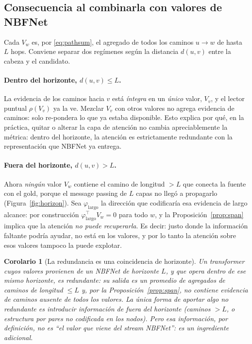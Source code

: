\documentclass[11pt]{article}
\theoremstyle{plain}
\newtheorem{corollary}[proposition]{Corolario}
\theoremstyle{definition}
\begin{document}
\subsection{Consecuencia al combinarla con valores de NBFNet}

Cada $V_w$ es, por \eqref{eq:pathsum}, el agregado de todos los caminos $u\to w$ de hasta $L$ hops.
Conviene separar dos regímenes según la distancia $d(u,v)$ entre la cabeza y el candidato.

\paragraph{Dentro del horizonte, $d(u,v)\le L$.}
La evidencia de los caminos hacia $v$ está \emph{íntegra} en un \emph{único} valor, $V_v$, y el lector
puntual $\rho(V_v)$ ya la ve. Mezclar $V_v$ con otros valores no agrega evidencia de caminos: solo
re-pondera lo que ya estaba disponible. Esto explica por qué, en la práctica, quitar o alterar la
capa de atención no cambia apreciablemente la métrica: dentro del horizonte, la atención es
estrictamente redundante con la representación que NBFNet ya entrega.

\paragraph{Fuera del horizonte, $d(u,v)>L$.}
Ahora \emph{ningún} valor $V_w$ contiene el camino de longitud $>L$ que conecta la fuente con el gold,
porque el message passing de $L$ capas no llegó a propagarlo (Figura~\ref{fig:horizon}). Sea
$\varphi_{\text{largo}}$ la dirección que codificaría esa evidencia de largo alcance: por construcción
$\varphi_{\text{largo}}^{\!\top}V_w=0$ para todo $w$, y la Proposición~\ref{prop:span} implica que la
atención \emph{no puede recuperarla}. Es decir: justo donde la información faltante podría ayudar, no
está en los valores, y por lo tanto la atención sobre esos valores tampoco la puede explotar.

\begin{corollary}[La redundancia es una coincidencia de horizonte]
\label{cor:horizon}
Un transformer cuyos valores provienen de un NBFNet de horizonte $L$, y que opera \emph{dentro de ese
mismo horizonte}, es redundante: su salida es un promedio de agregados de caminos de longitud $\le L$
y, por la Proposición~\ref{prop:span}, no contiene evidencia de caminos ausente de todos los valores.
La única forma de aportar algo no redundante es \emph{introducir información de fuera del horizonte}
(caminos $>L$, o estructura por pares no codificada en los nodos). Pero esa información, por
definición, no es ``el valor que viene del stream NBFNet'': es un ingrediente adicional.
\end{corollary}
\end{document}
